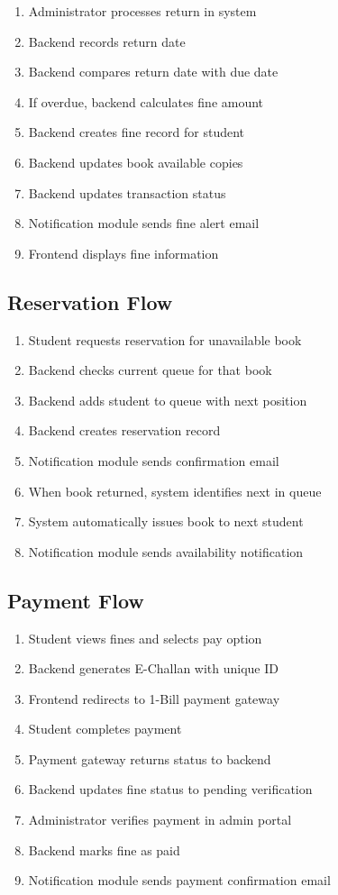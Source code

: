 \documentclass[12pt,a4paper]{report}
\begin{document}
\begin{enumerate}
    \item Administrator processes return in system
    \item Backend records return date
    \item Backend compares return date with due date
    \item If overdue, backend calculates fine amount
    \item Backend creates fine record for student
    \item Backend updates book available copies
    \item Backend updates transaction status
    \item Notification module sends fine alert email
    \item Frontend displays fine information
\end{enumerate}

\subsection{Reservation Flow}

\begin{enumerate}
    \item Student requests reservation for unavailable book
    \item Backend checks current queue for that book
    \item Backend adds student to queue with next position
    \item Backend creates reservation record
    \item Notification module sends confirmation email
    \item When book returned, system identifies next in queue
    \item System automatically issues book to next student
    \item Notification module sends availability notification
\end{enumerate}

\newpage

\subsection{Payment Flow}

\begin{enumerate}
    \item Student views fines and selects pay option
    \item Backend generates E-Challan with unique ID
    \item Frontend redirects to 1-Bill payment gateway
    \item Student completes payment
    \item Payment gateway returns status to backend
    \item Backend updates fine status to pending verification
    \item Administrator verifies payment in admin portal
    \item Backend marks fine as paid
    \item Notification module sends payment confirmation email
\end{enumerate}
\end{document}
